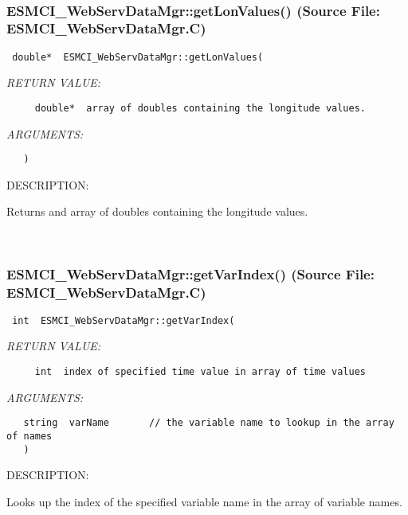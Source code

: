 \mbox{}\hrulefill\
 
\subsubsection{ESMCI\_WebServDataMgr::getLonValues() (Source File: ESMCI\_WebServDataMgr.C)}


  
\begin{verbatim} double*  ESMCI_WebServDataMgr::getLonValues(\end{verbatim}{\em RETURN VALUE:}
\begin{verbatim}     double*  array of doubles containing the longitude values.\end{verbatim}{\em ARGUMENTS:}
\begin{verbatim}   )\end{verbatim}
{\sf DESCRIPTION:\\ }


      Returns and array of doubles containing the longitude values.
   
 
\mbox{}\hrulefill\
 
\subsubsection{ESMCI\_WebServDataMgr::getVarIndex() (Source File: ESMCI\_WebServDataMgr.C)}


  
\begin{verbatim} int  ESMCI_WebServDataMgr::getVarIndex(\end{verbatim}{\em RETURN VALUE:}
\begin{verbatim}     int  index of specified time value in array of time values\end{verbatim}{\em ARGUMENTS:}
\begin{verbatim}   string  varName       // the variable name to lookup in the array of names
   )\end{verbatim}
{\sf DESCRIPTION:\\ }


      Looks up the index of the specified variable name in the array of
      variable names.
   
 
\mbox{}\hrulefill\
 
